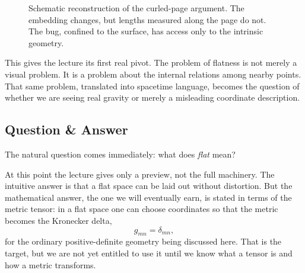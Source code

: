 \begin{figure}[t]
\centering
{}%
\caption{Schematic reconstruction of the curled-page argument. The embedding changes, but lengths measured along the page do not. The bug, confined to the surface, has access only to the intrinsic geometry.}
\end{figure}

This gives the lecture its first real pivot. The problem of flatness is not merely a visual problem. It is a problem about the internal relations among nearby points. That same problem, translated into spacetime language, becomes the question of whether we are seeing real gravity or merely a misleading coordinate description.

\subsection{Question \& Answer}

The natural question comes immediately: what does \emph{flat} mean?

At this point the lecture gives only a preview, not the full machinery. The intuitive answer is that a flat space can be laid out without distortion. But the mathematical answer, the one we will eventually earn, is stated in terms of the metric tensor: in a flat space one can choose coordinates so that the metric becomes the Kronecker delta,
\begin{equation}
g_{mn}=\delta_{mn},
\end{equation}
for the ordinary positive-definite geometry being discussed here. That is the target, but we are not yet entitled to use it until we know what a tensor is and how a metric transforms.


